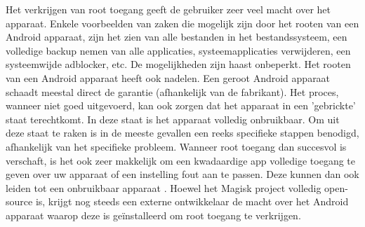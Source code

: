Het verkrijgen van root toegang geeft de gebruiker zeer veel macht over het apparaat. Enkele voorbeelden van zaken die mogelijk zijn door het rooten van een Android apparaat, zijn het zien van alle bestanden in het bestandssysteem, een volledige backup nemen van alle applicaties, systeemapplicaties verwijderen, een systeemwijde adblocker, etc. De mogelijkheden zijn haast onbeperkt. Het rooten van een Android apparaat heeft ook nadelen. Een geroot Android apparaat schaadt meestal direct de garantie (afhankelijk van de fabrikant). Het proces, wanneer niet goed uitgevoerd, kan ook zorgen dat het apparaat in een 'gebrickte' staat terechtkomt. In deze staat is het apparaat volledig onbruikbaar. Om uit deze staat te raken is in de meeste gevallen een reeks specifieke stappen benodigd, afhankelijk van het specifieke probleem. Wanneer root toegang dan succesvol is verschaft, is het ook zeer makkelijk om een kwadaardige app volledige toegang te geven over uw apparaat of een instelling fout aan te passen. Deze kunnen dan ook leiden tot een onbruikbaar apparaat \autocite{phelps_root-cons}. Hoewel het Magisk project volledig open-source is, krijgt nog steeds een externe ontwikkelaar de macht over het Android apparaat waarop deze is geïnstalleerd om root toegang te verkrijgen.
